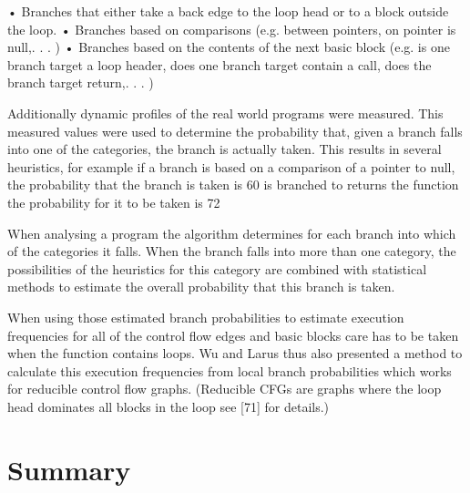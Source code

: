 • Branches that either take a back edge to the loop head or to a block
outside the loop.
• Branches based on comparisons (e.g. between pointers, on pointer is
null,. . . )
• Branches based on the contents of the next basic block (e.g. is one
branch target a loop header, does one branch target contain a call, does
the branch target return,. . . )

Additionally dynamic profiles of the real world programs were measured. This
measured values were used to determine the probability that, given a branch
falls into one of the categories, the branch is actually taken. This results in
several heuristics, for example if a branch is based on a comparison of a pointer
to null, the probability that the branch is taken is 60%
is branched to returns the function the probability for it to be taken is 72%

When analysing a program the algorithm determines for each branch into
which of the categories it falls. When the branch falls into more than one
category, the possibilities of the heuristics for this category are combined with
statistical methods to estimate the overall probability that this branch is taken.

When using those estimated branch probabilities to estimate execution frequencies
for all of the control flow edges and basic blocks care has to be taken
when the function contains loops. Wu and Larus thus also presented a method
to calculate this execution frequencies from local branch probabilities which
works for reducible control flow graphs. (Reducible CFGs are graphs where
the loop head dominates all blocks in the loop see [71] for details.)

\section{Summary}
